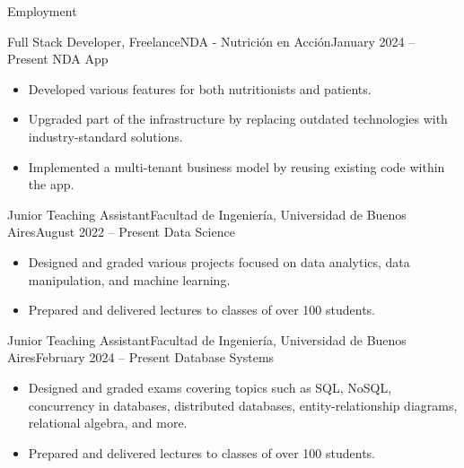 \documentclass[]{mcdowellcv}
\begin{document}
	\makeheader
	
	\begin{cvsection}{Employment}
		\begin{cvsubsection}{Full Stack Developer, Freelance}{NDA - Nutrición en Acción}{January 2024 -- Present}
			NDA App
			\begin{itemize}
				\item Developed various features for both nutritionists and patients.
				\item Upgraded part of the infrastructure by replacing outdated technologies with industry-standard solutions.
				\item Implemented a multi-tenant business model by reusing existing code within the app.
			\end{itemize}
		\end{cvsubsection}
		
		\begin{cvsubsection}{Junior Teaching Assistant}{Facultad de Ingeniería, Universidad de Buenos Aires}{August 2022 -- Present}
			Data Science
			\begin{itemize}
				\item Designed and graded various projects focused on data analytics, data manipulation, and machine learning.
				\item Prepared and delivered lectures to classes of over 100 students.
			\end{itemize}
		\end{cvsubsection}
		
		\begin{cvsubsection}{Junior Teaching Assistant}{Facultad de Ingeniería, Universidad de Buenos Aires}{February 2024 -- Present}
			Database Systems
			\begin{itemize}
				\item Designed and graded exams covering topics such as SQL, NoSQL, concurrency in databases, distributed databases, entity-relationship diagrams, relational algebra, and more.
				\item Prepared and delivered lectures to classes of over 100 students.
			\end{itemize}
		\end{cvsubsection}
	\end{cvsection}
	
\end{document}
